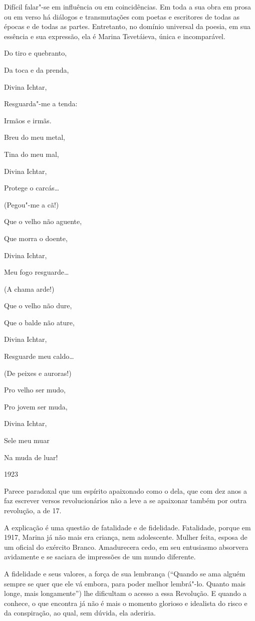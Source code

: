 Difícil falar"-se em influência ou em coincidências. Em toda a sua obra
em prosa ou em verso há diálogos e transmutações com poetas e escritores
de todas as épocas e de todas as partes. Entretanto, no domínio
universal da poesia, em sua essência e sua expressão, ela é Marina
Tsvetáieva, única e incomparável.

Do tiro e quebranto,

Da toca e da prenda,

Divina Ichtar,

Resguarda"-me a tenda:

Irmãos e irmãs.

Breu do meu metal,

Tina do meu mal,

Divina Ichtar,

Protege o carcás\ldots{}

(Pegou"-me a cã!)

Que o velho não aguente,

Que morra o doente,

Divina Ichtar,

Meu fogo resguarde\ldots{}

(A chama arde!)

Que o velho não dure,

Que o balde não ature,

Divina Ichtar,

Resguarde meu caldo\ldots{}

(De peixes e auroras!)

Pro velho ser mudo,

Pro jovem ser muda,

Divina Ichtar,

Sele meu muar

Na muda de luar!

1923

Parece paradoxal que um espírito apaixonado como o dela, que com dez
anos a faz escrever versos revolucionários não a leve a se apaixonar
também por outra revolução, a de 17.

A explicação é uma questão de fatalidade e de fidelidade. Fatalidade,
porque em 1917, Marina já não mais era criança, nem adolescente. Mulher
feita, esposa de um oficial do exército Branco. Amadurecera cedo, em seu
entusiasmo absorvera avidamente e se saciara de impressões de um mundo
diferente.

A fidelidade e seus valores, a força de sua lembrança (``Quando se ama
alguém sempre se quer que ele vá embora, para poder melhor lembrá"-lo.
Quanto mais longe, mais longamente'') lhe dificultam o acesso a essa
Revolução. E quando a conhece, o que encontra já não é mais o momento
glorioso e idealista do risco e da conspiração, ao qual, sem dúvida, ela
aderiria.

